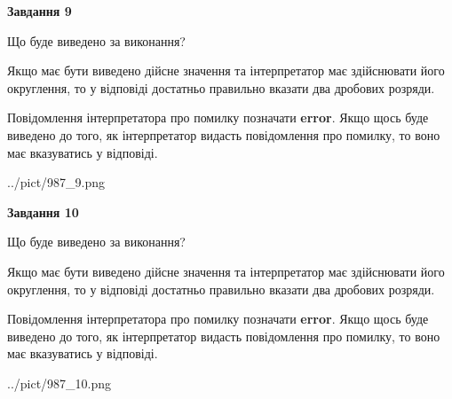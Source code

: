 \documentclass[12pt, ukrainian]{article}
\begin{document}
{\begin {Large}
{\begin {center}\textbf{Завдання 9}\end {center}}\par
Що буде виведено за виконання? \par

Якщо має бути виведено дійсне значення та інтерпретатор має здійснювати його округлення, 
то у відповіді достатньо правильно вказати два дробових розряди.

Повідомлення інтерпретатора про помилку позначати \textbf{error}.
Якщо щось буде виведено до того, як інтерпретатор видасть повідомлення про помилку, 
то воно має вказуватись у відповіді. \par

\begin{center}
	{../pict/987_9.png}
\end{center}
\newpage

{\begin {center}\textbf{Завдання 10}\end {center}}\par
Що буде виведено за виконання? \par

Якщо має бути виведено дійсне значення та інтерпретатор має здійснювати його округлення, 
то у відповіді достатньо правильно вказати два дробових розряди.

Повідомлення інтерпретатора про помилку позначати \textbf{error}.
Якщо щось буде виведено до того, як інтерпретатор видасть повідомлення про помилку, 
то воно має вказуватись у відповіді. \par

\begin{center}
	{../pict/987_10.png}
\end{center}
\newpage

\end {Large}}
\end{document}
